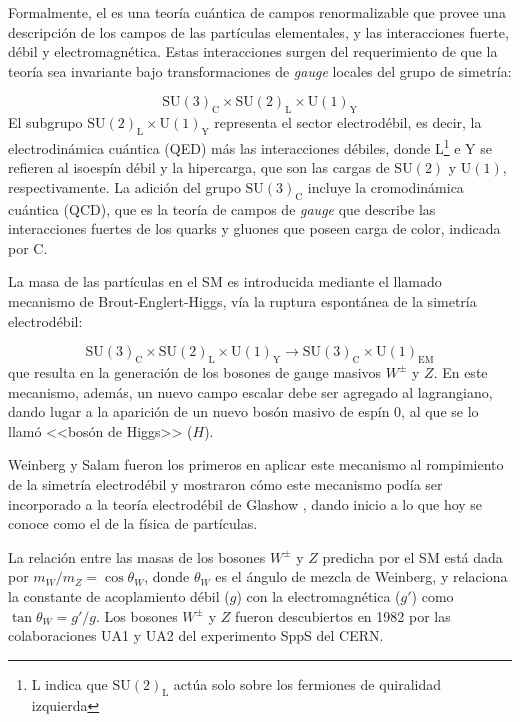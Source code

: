 Formalmente, el {\SM} es una teoría cuántica de campos renormalizable que provee
una descripción de los campos de las partículas elementales, y las interacciones
fuerte, débil y electromagnética. Estas interacciones surgen del requerimiento
de que la teoría sea invariante bajo transformaciones de \emph{gauge} locales del grupo
de simetría:

\begin{equation}
  \text{SU}(3)_\text{C} \times \text{SU}(2)_\text{L} \times \text{U}(1)_\text{Y}
\end{equation}
%
El subgrupo $\text{SU}(2)_\text{L} \times \text{U}(1)_\text{Y}$ representa el sector
electrodébil, es decir, la electrodinámica cuántica (QED) más las interacciones
débiles, donde L\footnote{L indica que $\text{SU}(2)_\text{L}$ actúa solo sobre los
  fermiones de quiralidad izquierda} e Y se refieren al isoespín débil y la
hipercarga, que son las cargas de $\text{SU}(2)$ y $\text{U}(1)$,
respectivamente. La adición del grupo $\text{SU}(3)_\text{C}$ incluye la cromodinámica
cuántica (QCD), que es la teoría de campos de \emph{gauge} que describe las
interacciones fuertes de los quarks y gluones que poseen carga de color,
indicada por C.

\setcounter{footnote}{0}

La masa de las partículas en el SM es introducida mediante el llamado mecanismo
de Brout-Englert-Higgs\cite{PhysRevLett.13.321,PhysRevLett.13.508}, vía la
ruptura espontánea de la simetría electrodébil:

\begin{equation}
  \text{SU}(3)_\text{C} \times \text{SU}(2)_\text{L} \times \text{U}(1)_\text{Y} \to \text{SU}(3)_\text{C}
  \times \text{U}(1)_\text{EM}
\end{equation}
%
que resulta en la generación de los bosones de gauge masivos $W^\pm$ y $Z$.
En este mecanismo, además, un nuevo campo escalar debe ser agregado al
lagrangiano, dando lugar a la aparición de un nuevo bosón masivo de espín
0, al que se lo llamó <<bosón de Higgs>> ($H$).

Weinberg y Salam fueron los primeros en aplicar este mecanismo al
rompimiento de la simetría electrodébil
\cite{PhysRevLett.19.1264,PhysRev.127.965} y mostraron cómo este mecanismo podía
ser incorporado a la teoría electrodébil de Glashow \cite{Glashow1961579}, dando
inicio a lo que hoy se conoce como el {\SM} de la física de partículas.

La relación entre las masas de los bosones $W^\pm$ y $Z$ predicha por el SM está
dada por $m_W/m_Z = \cos \theta_W$, donde $\theta_W$ es el ángulo de
mezcla de Weinberg, y relaciona la constante de acoplamiento débil ($g$) con la
electromagnética ($g'$) como $\tan\theta_W = g'/g$. Los bosones $W^\pm$ y $Z$
fueron descubiertos en 1982 por las colaboraciones UA1 y UA2 del experimento
SppS del CERN.

